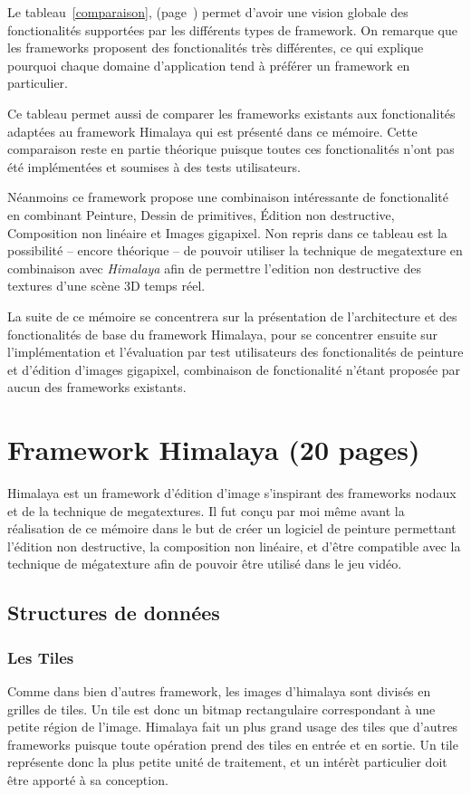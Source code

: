 	Le tableau~\ref{comparaison}, (page~\pageref{comparaison}) permet d'avoir une vision globale des fonctionalités supportées par les différents 
	types de framework. On remarque que les frameworks proposent des fonctionalités très différentes, ce qui explique pourquoi chaque 
	domaine d'application tend à préférer un framework en particulier.

	Ce tableau permet aussi de comparer les frameworks existants aux fonctionalités adaptées au framework Himalaya qui est présenté dans ce mémoire. Cette
	comparaison reste en partie théorique puisque toutes ces fonctionalités n'ont pas été implémentées et soumises à des tests utilisateurs. 
	
	Néanmoins ce framework propose une combinaison intéressante de fonctionalité en combinant Peinture, Dessin de primitives, Édition non destructive, 
	Composition non linéaire et Images gigapixel. Non repris dans ce tableau est la possibilité -- encore théorique -- de pouvoir utiliser la technique
	de megatexture en combinaison avec \emph{Himalaya} afin de permettre l'edition non destructive des textures d'une scène 3D temps réel.

	La suite de ce mémoire se concentrera sur la présentation de l'architecture et des fonctionalités de base du framework Himalaya, pour se concentrer
	ensuite sur l'implémentation et l'évaluation par test utilisateurs des fonctionalités de peinture et d'édition d'images gigapixel, combinaison de
	fonctionalité n'étant proposée par aucun des frameworks existants.

\chapter{Framework Himalaya (20 pages) }
	Himalaya est un framework d'édition d'image s'inspirant des frameworks nodaux et de la technique de megatextures. Il fut conçu par moi même avant la
	réalisation de ce mémoire dans le but de créer un logiciel de peinture permettant l'édition non destructive, la composition non linéaire, et d'être
	compatible avec la technique de mégatexture afin de pouvoir être utilisé dans le jeu vidéo. 


	\section{Structures de données}
		\subsection{Les Tiles}
		Comme dans bien d'autres framework, les images d'himalaya sont divisés en grilles de tiles. Un tile est donc un bitmap rectangulaire correspondant
		à une petite région de l'image. Himalaya fait un plus grand usage des tiles que d'autres frameworks puisque toute opération prend des tiles
		en entrée et en sortie. Un tile représente donc la plus petite unité de traitement, et un intérèt particulier doit être apporté à sa conception.


